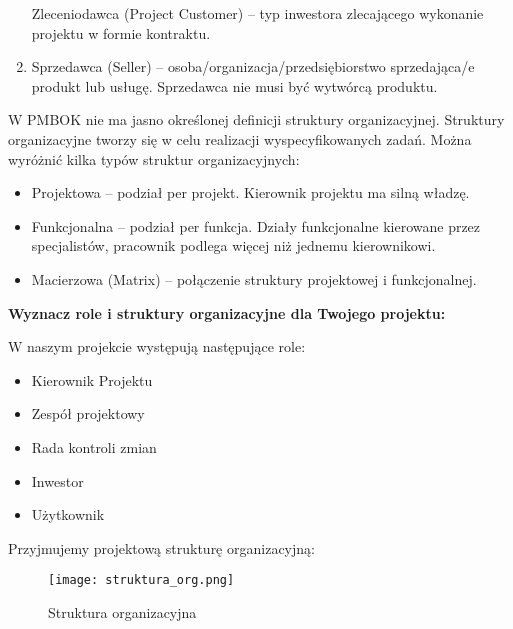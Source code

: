 \begin{enumerate}
Zleceniodawca (Project Customer) – typ inwestora zlecającego wykonanie projektu w formie kontraktu. 
\item	Sprzedawca (Seller) – osoba/organizacja/przedsiębiorstwo sprzedająca/e produkt lub usługę. Sprzedawca nie musi być wytwórcą produktu.
\end{enumerate}

W PMBOK nie ma jasno określonej definicji struktury organizacyjnej. Struktury organizacyjne tworzy się w celu realizacji wyspecyfikowanych zadań. Można wyróżnić kilka typów struktur organizacyjnych:
\begin{itemize}
\item	Projektowa – podział per projekt. Kierownik projektu ma silną władzę. 
\item	Funkcjonalna – podział per funkcja. Działy funkcjonalne kierowane przez specjalistów, pracownik podlega więcej niż jednemu kierownikowi.
\item	Macierzowa (Matrix) – połączenie struktury projektowej i funkcjonalnej.
\end{itemize}


\textbf{Wyznacz role i struktury organizacyjne dla Twojego projektu:}


W naszym projekcie występują następujące role:
\begin{itemize}
\item Kierownik Projektu
\item Zespół projektowy
\item Rada kontroli zmian
\item Inwestor
\item Użytkownik
\end{itemize}

\clearpage

Przyjmujemy projektową strukturę organizacyjną:
\begin{figure}[!ht]
\begin{center}
\texttt{[image: struktura\_org.png]}
\caption[Struktura organizacyjna]{Struktura organizacyjna}
\label{rysunekProces}
\end{center}
\end{figure}




